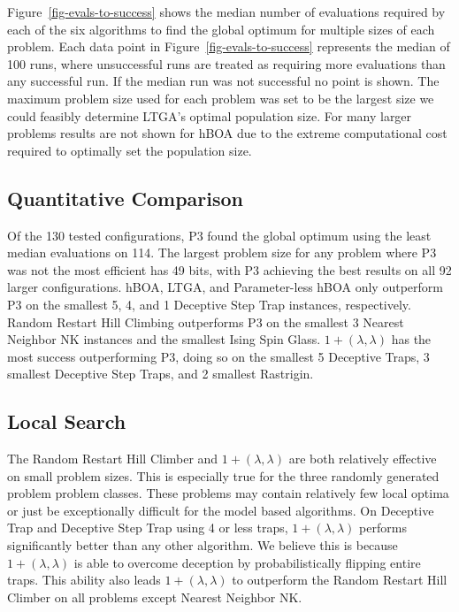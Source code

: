 \documentclass[twoside]{article}
\begin{document}
Figure~\ref{fig-evals-to-success} shows the median number of evaluations required by each of the six
algorithms to find the global optimum for multiple sizes of each problem.  Each data point in
Figure~\ref{fig-evals-to-success} represents the median of 100 runs, where unsuccessful runs
are treated as requiring more evaluations than any successful run. If the median run was not successful
no point is shown. The maximum problem size used for each problem was set to be the largest size we could
feasibly determine LTGA's optimal population size. For many larger problems results are not shown
for hBOA due to the extreme computational cost required to optimally set the population size.

\subsection{Quantitative Comparison}
Of the 130 tested configurations, P3 found the global optimum using the least median evaluations on 114.
The largest problem size for any problem where P3 was not the most efficient has 49 bits, with P3 achieving the best results on all 92 larger
configurations. hBOA, LTGA, and Parameter-less hBOA only outperform P3 on the smallest 5, 4, and 1 Deceptive
Step Trap instances, respectively. Random Restart Hill Climbing outperforms P3 on the smallest 3 Nearest Neighbor NK instances
and the smallest Ising Spin Glass. $1+(\lambda, \lambda)$ has the most success outperforming P3, doing so
on the smallest 5 Deceptive Traps, 3 smallest Deceptive Step Traps, and 2 smallest Rastrigin.

\subsection{Local Search}
The Random Restart Hill Climber and $1+(\lambda, \lambda)$ are both relatively effective on small problem
sizes. This is especially true for the three randomly generated problem problem classes. These problems
may contain relatively few local optima or just be exceptionally difficult for the model based algorithms.
On Deceptive Trap and Deceptive Step Trap using 4 or less traps, $1+(\lambda, \lambda)$ performs significantly
better than any other algorithm. We believe this is
because $1+(\lambda, \lambda)$ is able to overcome deception by probabilistically
flipping entire traps.
This ability also leads $1+(\lambda, \lambda)$
to outperform the Random Restart Hill Climber on all problems except Nearest Neighbor NK.
\end{document}
